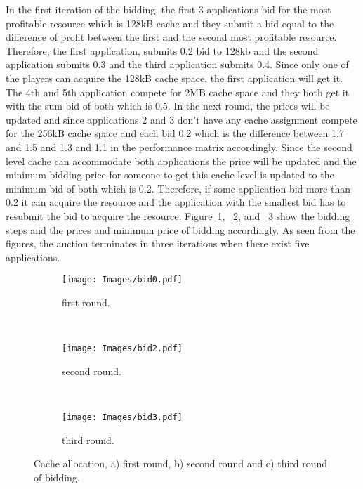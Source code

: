 In the first iteration of the bidding, the first 3 applications bid for the most profitable resource which is 128kB cache and they submit a bid equal to the difference of profit between the first and the second most profitable resource. Therefore, the first application, submits 0.2 bid to 128kb and the second application submits 0.3 and the third application submits 0.4. Since only one of the players can acquire the 128kB cache space, the first application will get it. The 4th and 5th application compete for 2MB cache space and they both get it with the sum bid of both which is 0.5. In the next round, the prices will be updated and since applications 2 and 3 don't have any cache assignment compete for the 256kB cache space and each bid 0.2 which is the difference between 1.7 and 1.5 and 1.3 and 1.1 in the performance matrix accordingly. Since the second level cache can accommodate both applications the price will be updated and the minimum bidding price for someone to get this cache level is updated to the minimum bid of both which is 0.2. Therefore, if some application bid more than 0.2 it can acquire the resource and the application with the smallest bid has to resubmit the bid to acquire the resource. Figure~\ref{fig:first_round}, ~\ref{fig:second_round}, and ~\ref{fig:third_round} show the bidding steps and the prices and minimum price of bidding accordingly. As seen from the figures, the auction terminates in three iterations when there exist five applications. 
\begin{figure*}[!htb]
        \centering
        \begin{subfigure}[b]{0.28\textwidth} %
                \texttt{[image: Images/bid0.pdf]}
                \caption{first round.}
                \label{fig:first_round}
        \end{subfigure}%
        ~ %
        \begin{subfigure}[b]{0.28\textwidth}
                \texttt{[image: Images/bid2.pdf]}
                \caption{second round.}
                \label{fig:second_round}
        \end{subfigure}
        ~ %
        \begin{subfigure}[b]{0.28\textwidth}
                \texttt{[image: Images/bid3.pdf]}
                \caption{third round.}
                \label{fig:third_round}
        \end{subfigure}  

                \caption{Cache allocation, a) first round, b) second round and c) third round of bidding.}\label{fig:Auction_rounds}    
\end{figure*}
